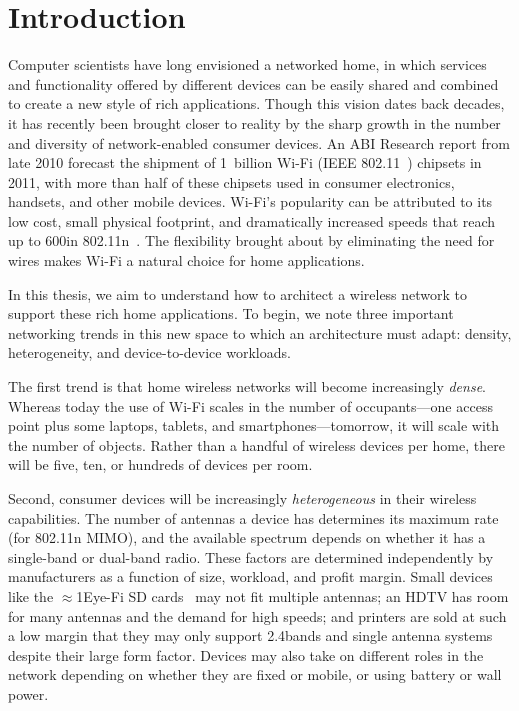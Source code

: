 \section{Introduction}
\label{sec:intro}

Computer scientists have long envisioned a networked home, in which services and functionality offered by different devices can be easily shared and combined to create a new style of rich applications. Though this vision dates back decades, it has recently been brought closer to reality by the sharp growth in the number and diversity of network-enabled consumer devices. An ABI Research report from late 2010 forecast the shipment of 1~billion Wi-Fi (IEEE 802.11~\cite{80211}) chipsets in 2011, with more than half of these chipsets used in consumer electronics, handsets, and other mobile devices. Wi-Fi's popularity can be attributed to its low cost, small physical footprint, and dramatically increased speeds that reach up to 600\Mbps in 802.11n~\cite{80211n}. The flexibility brought about by eliminating the need for wires makes Wi-Fi a natural choice for home applications.

In this thesis, we aim to understand how to architect a wireless network to support these rich home applications. To begin, we note three important networking trends in this new space to which an architecture must adapt: density, heterogeneity, and device-to-device workloads.

The first trend is that home wireless networks will become increasingly \emph{dense}. Whereas today the use of Wi-Fi scales in the number of occupants---one access point plus some laptops, tablets, and smartphones---tomorrow, it will scale with the number of objects. Rather than a handful of wireless devices per home, there will be five, ten, or hundreds of devices per room.

Second, consumer devices will be increasingly \emph{heterogeneous} in their wireless capabilities. The number of antennas a device has determines its maximum rate (for 802.11n MIMO), and the available spectrum depends on whether it has a single-band or dual-band radio. These factors are determined independently by manufacturers as a function of size, workload, and profit margin. Small devices like the $\approx$1\insq Eye-Fi SD cards~\cite{eyefi} may not fit multiple antennas; an HDTV has room for many antennas and the demand for high speeds; and printers are sold at such a low margin that they may only support 2.4\GHz bands and single antenna systems despite their large form factor. Devices may also take on different roles in the network depending on whether they are fixed or mobile, or using battery or wall power.

